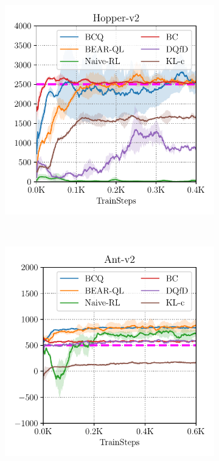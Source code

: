 \begin{figure}[t!]
\begin{subfigure}[t]{0.23\textwidth}
        \includegraphics[width=0.99\linewidth]{chapters/bear/images/images_camera_ready/hopper_optimal_camera_ready.pdf}
    \end{subfigure}
    ~
    \begin{subfigure}[t]{0.23\textwidth}
        \centering
        \includegraphics[width=0.99\linewidth]{chapters/bear/images/images_camera_ready/ant_random_camera_ready.pdf}

\end{subfigure}
\end{figure}
